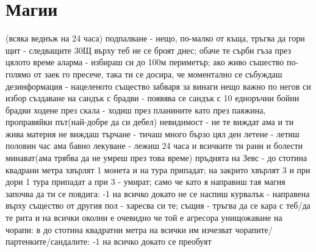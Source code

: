 \documentclass{article}
\begin{document}
\section{Магии}
(всяка веднъж на 24 часа)
подпалване - нещо, по-малко от къща, тръгва да гори
щит - следващите 30Щ върху теб не се броят днес; обаче те сърби гъза през цялото време
аларма - избираш си до 100м периметър; ако живо съшество по-голямо от заек го пресече, така ти се досира, че моментално се събуждаш
дезинформация - нацеленото същество забваря за винаги нещо важно по негов си избор
създаване на сандък с брадви - появява се сандък с 10 едноръчни бойни брадви
ходене през скала - ходиш през планините като през паяжина, проправяйки път(най-добре да си дебел)
невидимост - не те виждат ама и ти жива материя не виждаш
търчане - тичаш много бързо цял ден
летене - летиш половин час ама бавно
лекуване - лежиш 24 часа и всичките ти рани и болести минават(ама трябва да не умреш през това време)
пръднята на Зевс - до стотина квадрани метра хвърлят 1 монета и на тура припадат; на закрито хвърлят 3 и при дори 1 тура припадат а при 3 - умират; само че като я направиш тая магия започва да ти се повдига: -1 на всичко докато не се наспиш
курвалък - направена върху същество от другия пол - харесва си те; същия - тръгва да се кара с теб/да те рита и на всички околни е очевидно че той е агресора
унищожаване на чорапи: в до стотина квадратни метра на всички им изчезват чорапите/партенките/сандалите: -1 на всичко докато се преобуят
\end{document}
